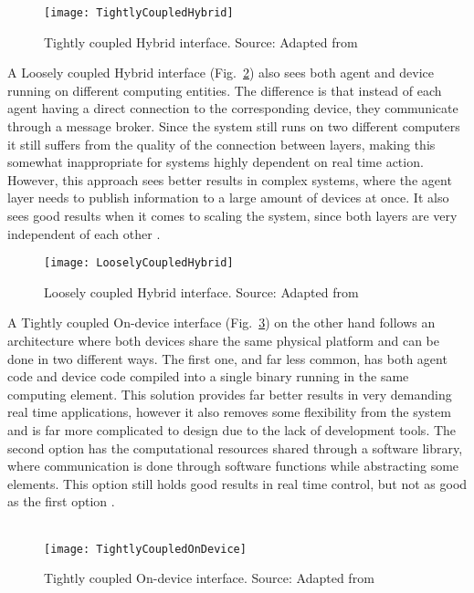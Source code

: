 \begin{figure}[h!]
	\centering
	\texttt{[image: TightlyCoupledHybrid]}
	\caption{Tightly coupled Hybrid interface. Source: Adapted from \cite{8591641}}
	\label{fig:tightly_coupled_hybrid}
\end{figure}

A Loosely coupled Hybrid interface (Fig.~\ref{fig:loosely_coupled_hybrid}) also sees both agent and device running on different computing entities. The difference is that instead of each agent having a direct connection to the corresponding device, they communicate through a message broker. Since the system still runs on two different computers it still suffers from the quality of the connection between layers, making this somewhat inappropriate for systems highly dependent on real time action. However, this approach sees better results in complex systems, where the agent layer needs to publish information to a large amount of devices at once. It also sees good results when it comes to scaling the system, since both layers are very independent of each other \cite{8591641}.\\

\begin{figure}[h!]
	\centering
	\texttt{[image: LooselyCoupledHybrid]}
	\caption{Loosely coupled Hybrid interface. Source: Adapted from \cite{8591641}}
	\label{fig:loosely_coupled_hybrid}
\end{figure}

A Tightly coupled On-device interface (Fig.~\ref{fig:tightly_coupled_ondevice}) on the other hand follows an architecture where both devices share the same physical platform and can be done in two different ways. The first one, and far less common, has both agent code and device code compiled into a single binary running in the same computing element. This solution provides far better results in very demanding real time applications, however it also removes some flexibility from the system and is far more complicated to design due to the lack of development tools. The second option has the computational resources shared through a software library, where communication is done through software functions while abstracting some elements. This option still holds good results in real time control, but not as good as the first option \cite{8591641}.\\\\

\begin{figure}[h!]
	\centering
	\texttt{[image: TightlyCoupledOnDevice]}
	\caption{Tightly coupled On-device interface. Source: Adapted from \cite{8591641}}
	\label{fig:tightly_coupled_ondevice}
\end{figure}

